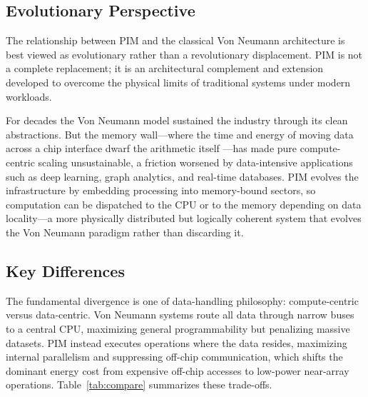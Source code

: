\documentclass{article} %
\begin{document}
\subsection{Evolutionary Perspective}

The relationship between PIM and the classical Von Neumann architecture is best viewed as evolutionary rather than a revolutionary displacement. PIM is not a complete replacement; it is an architectural complement and extension developed to overcome the physical limits of traditional systems under modern workloads.

For decades the Von Neumann model sustained the industry through its clean abstractions. But the memory wall---where the time and energy of moving data across a chip interface dwarf the arithmetic itself \citep{horowitz2014energy}---has made pure compute-centric scaling unsustainable, a friction worsened by data-intensive applications such as deep learning, graph analytics, and real-time databases. PIM evolves the infrastructure by embedding processing into memory-bound sectors, so computation can be dispatched to the CPU or to the memory depending on data locality---a more physically distributed but logically coherent system that evolves the Von Neumann paradigm rather than discarding it.

\subsection{Key Differences}

The fundamental divergence is one of data-handling philosophy: compute-centric versus data-centric. Von Neumann systems route all data through narrow buses to a central CPU, maximizing general programmability but penalizing massive datasets. PIM instead executes operations where the data resides, maximizing internal parallelism and suppressing off-chip communication, which shifts the dominant energy cost from expensive off-chip accesses to low-power near-array operations. Table~\ref{tab:compare} summarizes these trade-offs.
\end{document}
